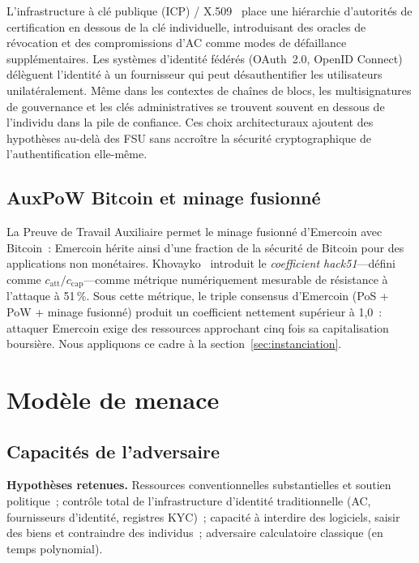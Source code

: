 \documentclass[11pt,a4paper]{article}
\begin{document}
L'infrastructure à clé publique (ICP) / X.509~\cite{rfc5280} place une
hiérarchie d'autorités de certification en dessous de la clé individuelle,
introduisant des oracles de révocation et des compromissions d'AC comme modes
de défaillance supplémentaires.  Les systèmes d'identité fédérés (OAuth~2.0,
OpenID Connect) délèguent l'identité à un fournisseur qui peut désauthentifier
les utilisateurs unilatéralement.  Même dans les contextes de chaînes de
blocs, les multisignatures de gouvernance et les clés administratives se
trouvent souvent en dessous de l'individu dans la pile de confiance.  Ces
choix architecturaux ajoutent des hypothèses au-delà des FSU sans accroître
la sécurité cryptographique de l'authentification elle-même.

\subsection{AuxPoW Bitcoin et minage fusionné}

La Preuve de Travail Auxiliaire permet le minage fusionné d'Emercoin avec
Bitcoin~: Emercoin hérite ainsi d'une fraction de la sécurité de Bitcoin pour
des applications non monétaires.  Khovayko~\cite{hack51} introduit le
\emph{coefficient hack51}---défini comme $c_{\mathrm{att}} / c_{\mathrm{cap}}$---comme métrique numériquement mesurable de
résistance à l'attaque à 51\,\%.  Sous cette métrique, le triple consensus
d'Emercoin (PoS + PoW + minage fusionné) produit un coefficient nettement
supérieur à 1,0~: attaquer Emercoin exige des ressources approchant cinq fois
sa capitalisation boursière.  Nous appliquons ce cadre à la section~\ref{sec:instanciation}.

\section{Modèle de menace}

\subsection{Capacités de l'adversaire}

\textbf{Hypothèses retenues.}  Ressources conventionnelles substantielles et
soutien politique~; contrôle total de l'infrastructure d'identité traditionnelle
(AC, fournisseurs d'identité, registres KYC)~; capacité à interdire des
logiciels, saisir des biens et contraindre des individus~; adversaire
calculatoire classique (en temps polynomial).
\end{document}
